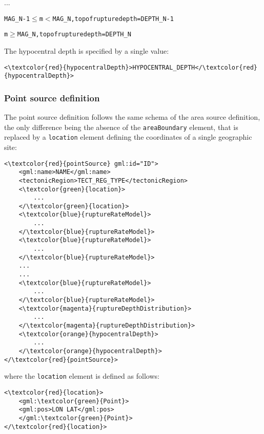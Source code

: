 		...
\begin{alltt}MAG_N-1 \(\leq\) m \(<\) MAG_N, top of rupture depth = DEPTH_N-1 \end{alltt}
\begin{alltt}m \(\geq\) MAG_N, top of rupture depth = DEPTH_N \end{alltt}
The hypocentral depth is specified by a single value:
\begin{Verbatim}[frame=single, commandchars=\\\{\},fontsize=\normalsize, samepage=true]
<\textcolor{red}{hypocentralDepth}>HYPOCENTRAL_DEPTH</\textcolor{red}{hypocentralDepth}>
\end{Verbatim}

\subsubsection{Point source definition}
The point source definition follows the same schema of the area source definition, the only
difference being the absence of the \Verb+areaBoundary+ element, that is replaced by a
\Verb+location+ element defining the coordinates of a single geographic site:
\begin{Verbatim}[frame=single, commandchars=\\\{\},fontsize=\normalsize, samepage=true]
<\textcolor{red}{pointSource} gml:id="ID">
	<gml:name>NAME</gml:name>
	<tectonicRegion>TECT_REG_TYPE</tectonicRegion>
	<\textcolor{green}{location}>
		...
	</\textcolor{green}{location}>
	<\textcolor{blue}{ruptureRateModel}>
		...
	</\textcolor{blue}{ruptureRateModel}>
	<\textcolor{blue}{ruptureRateModel}>
		...
	</\textcolor{blue}{ruptureRateModel}>
	...
	...
	<\textcolor{blue}{ruptureRateModel}>
		...
	</\textcolor{blue}{ruptureRateModel}>
	<\textcolor{magenta}{ruptureDepthDistribution}>
		...
	</\textcolor{magenta}{ruptureDepthDistribution}>
	<\textcolor{orange}{hypocentralDepth}>
		...	
	</\textcolor{orange}{hypocentralDepth}>
</\textcolor{red}{pointSource}>
\end{Verbatim}
where the \Verb+location+ element is defined as follows:
\begin{Verbatim}[frame=single, commandchars=\\\{\},fontsize=\normalsize, samepage=true]
<\textcolor{red}{location}>
	<gml:\textcolor{green}{Point}>
	<gml:pos>LON LAT</gml:pos>
	</gml:\textcolor{green}{Point}>
</\textcolor{red}{location}>
\end{Verbatim}


